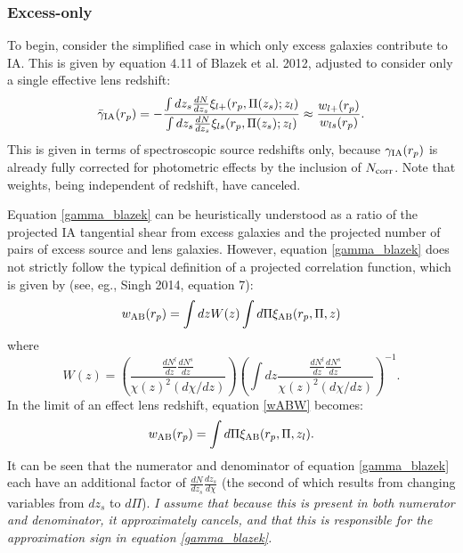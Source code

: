 \documentclass[onecolumn,amsmath,aps,fleqn, superscriptaddress]{revtex4}
\begin{document}
\subsubsection*{Excess-only}
To begin, consider the simplified case in which only excess galaxies contribute to IA. This is given by equation 4.11 of Blazek et al. 2012, adjusted to consider only a single effective lens redshift:
\begin{equation}
\bar{\gamma}_{\rm IA}(r_p) = -\frac{\int dz_s \frac{dN}{dz_s} \xi_{l+}(r_p, \Pi(z_s); z_l)}{\int dz_s \frac{dN}{dz_s} \xi_{ls}(r_p, \Pi(z_s); z_l)} \approx \frac{w_{l+}(r_p)}{w_{ls}(r_p)}.
\label{gamma_blazek}
\end{equation}
This is given in terms of spectroscopic source redshifts only, because $\gamma_{\rm IA}(r_p)$ is already fully corrected for photometric effects by the inclusion of $N_{\rm corr}$. Note that weights, being independent of redshift, have canceled. 

Equation \ref{gamma_blazek} can be heuristically understood as a ratio of the projected IA tangential shear from excess galaxies and the projected number of pairs of excess source and lens galaxies. However, equation \ref{gamma_blazek} does not strictly follow the typical definition of a projected correlation function, which is given by (see, eg., Singh 2014, equation 7):
\begin{equation}
w_{\rm AB}(r_p) = \int dz W(z) \int d\Pi \xi_{\rm AB}(r_p, \Pi, z)
\label{wABW}
\end{equation}
where 
\begin{equation}
W(z) = \left(\frac{\frac{dN^l}{dz}\frac{dN^s}{dz}}{\chi(z)^2 (d\chi/dz)}\right) \left(\int dz \frac{\frac{dN^l}{dz}\frac{dN^s}{dz}}{\chi(z)^2 (d\chi/dz)}\right)^{-1}.
\label{wz}
\end{equation}
In the limit of an effect lens redshift, equation \ref{wABW} becomes:
\begin{equation}
w_{\rm AB}(r_p) = \int d\Pi \xi_{\rm AB}(r_p, \Pi, z_l).
\label{wAB}
\end{equation}
It can be seen that the numerator and denominator of equation \ref{gamma_blazek} each have an additional factor of $\frac{dN}{dz_s}\frac{dz_s}{d\chi}$ (the second of which results from changing variables from $dz_s$ to $d\Pi$). {\it I assume that because this is present in both numerator and denominator, it approximately cancels, and that this is responsible for the approximation sign in equation \ref{gamma_blazek}.} 
\end{document}
